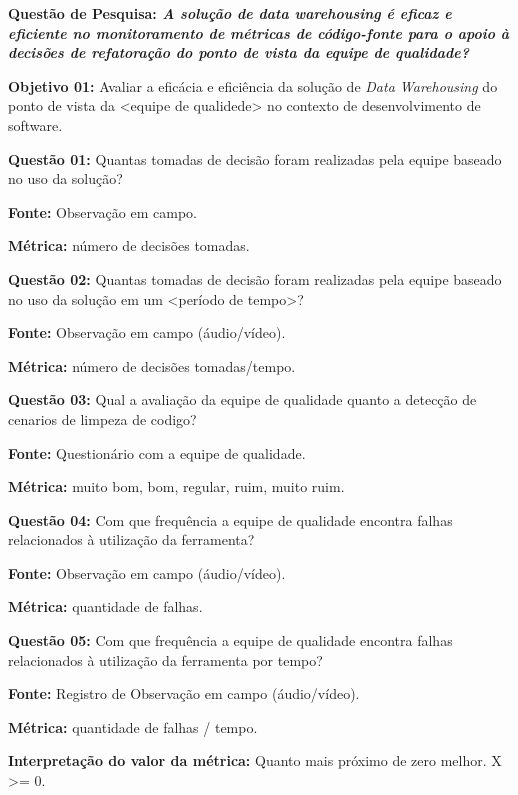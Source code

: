 \textbf{Questão de Pesquisa: \textit{A solução de data warehousing é eficaz e eficiente no monitoramento de métricas de código-fonte para o apoio à decisões de refatoração do ponto de vista da equipe de qualidade?}}

\textbf{Objetivo 01:} Avaliar a eficácia e eficiência da solução de \textit{Data Warehousing} do ponto de vista da <equipe de qualidede> no contexto de desenvolvimento de software. \newline


\textbf{Questão 01:} Quantas tomadas de decisão foram realizadas pela equipe baseado no uso da solução?

\textbf{Fonte:} Observação em campo.

\textbf{Métrica:} número de decisões tomadas. \newline

\textbf{Questão 02:} Quantas tomadas de decisão foram realizadas pela equipe baseado no uso da solução em um <período de tempo>?

\textbf{Fonte:} Observação em campo (áudio/vídeo).

\textbf{Métrica:} número de decisões tomadas/tempo. \newline


\textbf{Questão 03:} Qual a avaliação da equipe de qualidade quanto a detecção de cenarios de limpeza de codigo?

\textbf{Fonte:} Questionário com a equipe de qualidade.

\textbf{Métrica:} muito bom, bom, regular, ruim, muito ruim. \newline


\textbf{Questão 04:} Com que frequência a equipe de qualidade encontra falhas relacionados à utilização da ferramenta?

\textbf{Fonte:} Observação em campo (áudio/vídeo).

\textbf{Métrica:} quantidade de falhas. \newline


\textbf{Questão 05:} Com que frequência a equipe de qualidade encontra falhas relacionados à utilização da ferramenta por tempo?

\textbf{Fonte:} Registro de Observação em campo (áudio/vídeo).

\textbf{Métrica:} quantidade de falhas / tempo. 

\textbf{Interpretação do valor da métrica:} Quanto mais próximo de zero melhor. X >= 0. \newline


